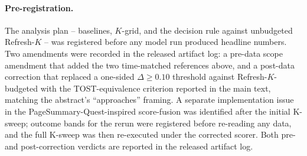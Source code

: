 \documentclass{article}
\begin{document}
\paragraph{Pre-registration.} The analysis plan -- baselines, $K$-grid, and the decision rule against unbudgeted Refresh-$K$ -- was registered before any model run produced headline numbers. Two amendments were recorded in the released artifact log: a pre-data scope amendment that added the two time-matched references above, and a post-data correction that replaced a one-sided $\Delta\geq 0.10$ threshold against Refresh-$K$-budgeted with the TOST-equivalence criterion reported in the main text, matching the abstract's ``approaches'' framing. A separate implementation issue in the PageSummary-Quest-inspired score-fusion was identified after the initial K-sweep; outcome bands for the rerun were registered before re-reading any data, and the full K-sweep was then re-executed under the corrected scorer. Both pre- and post-correction verdicts are reported in the released artifact log.
\endgroup
\end{document}
